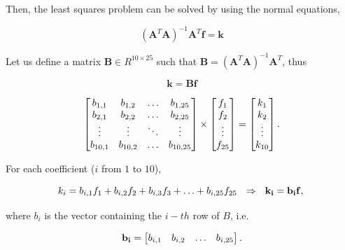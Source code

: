 \documentclass{ipol}
\numberwithin{equation}{section}
\numberwithin{table}{section}
\begin{document}
Then, the least squares problem can be solved by using the normal equations,

\begin{equation*}
	(\mathbf{A}^T\mathbf{A})^{-1}\mathbf{A}^T\mathbf{f} = \mathbf{k} 
\end{equation*}

Let us define a matrix $\mathbf{B} \in R^{10\times25}$ such that $\mathbf{B}=(\mathbf{A}^T\mathbf{A})^{-1}\mathbf{A}^T$, thus

$$ \mathbf{k} = \mathbf{B}\mathbf{f} $$

\begin{equation*}
	\begin{bmatrix}
		b_{1,1}		& b_{1,2}	& \hdots	& b_{1,25}	\\
		b_{2,1}		& b_{2,2}	& \hdots	& b_{2,25}	\\
		\vdots		& \vdots	& \ddots	& \vdots	\\
		b_{10,1}	& b_{10,2}	& \hdots	& b_{10,25}
	\end{bmatrix}
	\times
	\begin{bmatrix}
		f_1		\\
		f_2		\\
		\vdots	\\
		f_{25}
	\end{bmatrix}
	=
	\begin{bmatrix}
		k_1		\\
		k_2		\\
		\vdots	\\
		k_{10}
	\end{bmatrix} .\\
\end{equation*}

For each coefficient ($i$ from $1$ to $10$), 

\begin{equation}
	\label{eq:coefficients}
	k_i = b_{i,1}f_1 + b_{i,2}f_2 + b_{i,3}f_3 + \hdots + b_{i,25}f_{25} \ \ \Rightarrow \ \ \mathbf{k_i} = \mathbf{b_i}\mathbf{f} ,\\
\end{equation}

where $b_i$ is the vector containing the $i-th$ row of $B$, i.e.

\begin{equation}
	\label{eq:b_i_v}
	\mathbf{b_i} = \begin{bmatrix}	b_{i,1}		& b_{i,2}	& \hdots	& b_{i,25}
					\end{bmatrix}.\\
\end{equation}
\end{document}
